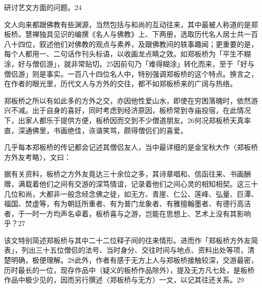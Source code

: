 \noindent 研讨艺文方面的问题。24


文人向来都跟佛教有些渊源，当然包括与和尚的互动往来，其中最被人称道的是郑板桥。慧禅独具见识的编撰《名人与佛教》上、下两册，选取历代名人居士共一百八十四位，叙述他们对佛教的观点与素养，及跟佛教间的轶事趣闻；更重要的是，每个人都用一、二句话作刊头标语，以收画龙点睛之效。如郑板桥为「平生不糊涂，好与僧侣游」，就非常贴切。25因前句乃「难得糊涂」转化而来，至于「好与僧侣游」则是事实。一百八十四位名人中，特别强调郑板桥的这个特点。换言之，在作者的眼光里，历代文人与方外的交往，都不如郑板桥来的广阔与热络。

郑板桥之所以有如此多的方外之交，亦因他性爱山水，即使在穷困落魄时，依然游兴不减。出于自身的喜好，同时考虑到经济原因，板桥常到寺庙投宿，在此情况下，出家人都乐于提供方便，板桥因而交到不少僧道朋友。26何况郑板桥天真率直，深通佛里，书画绝佳，诙谐笑骂，颇得僧侣们的喜爱。

几乎每本郑板桥的传记都会记述其僧侣友人，当中最详细的是金宝秋大作〈郑板桥方外友考略〉，文曰：

\begin{BookQuote}
据有关资料，板桥之方外友竟达三十余位之多，其诗章唱和、信函往来、书画酬赠，满载着他们之间有交游的深笃情谊，记录着他们之间心灵的相知相契。这三十几位和尚，大都非一般念经念佛之徒，如无方、青崖、仁公、莲峰、弘量、巨潭、福国、焚虚等，有为朝廷所重者、有为普门龙象者、有雅擅翰墨者、有德行高洁者，于一时一方均声名卓着，板桥喜与之游，岂能在思想上、艺术上没有其影响乎？27
\end{BookQuote}

\vfill
\begin{BookNotes}
\end{BookNotes}

该文特别简述郑板桥与其中二十二位释子间的往来情形。进而作「郑板桥方外友简表」，列出三十五位僧侣的法号、当时身分、交往时间与地点、资料出处等项，清楚明确，极便理解。28此外，作者有感于无方上人与郑板桥接触较深，交游最密，历时最长的一位，现存作品中（疑义的板桥作品除外），提及无方凡七处，是板桥作品中极少见的，因而另行撰述〈郑板桥与无方〉一文，以记其往还关系。29

